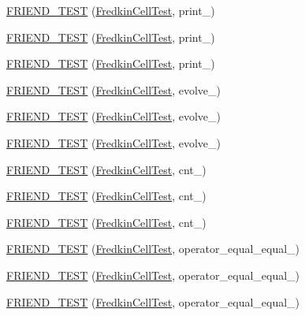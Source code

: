 \begin{DoxyCompactItemize}
\item 
\hyperlink{classFredkinCell_aac5c84ac580e6e1e332ecc0cf38680f3}{F\-R\-I\-E\-N\-D\-\_\-\-T\-E\-S\-T} (\hyperlink{classFredkinCell_aef267ce10e0a76047d409a41033eea05}{Fredkin\-Cell\-Test}, print\-\_)
\item 
\hyperlink{classFredkinCell_a134f08a3c36618fb6e8ae33f419e6aec}{F\-R\-I\-E\-N\-D\-\_\-\-T\-E\-S\-T} (\hyperlink{classFredkinCell_aef267ce10e0a76047d409a41033eea05}{Fredkin\-Cell\-Test}, print\-\_)
\item 
\hyperlink{classFredkinCell_a707a250c84473f2fd88defae0fb47ae4}{F\-R\-I\-E\-N\-D\-\_\-\-T\-E\-S\-T} (\hyperlink{classFredkinCell_aef267ce10e0a76047d409a41033eea05}{Fredkin\-Cell\-Test}, print\-\_)
\item 
\hyperlink{classFredkinCell_a6fb79cedf31164ba2f4398fe68a36f2b}{F\-R\-I\-E\-N\-D\-\_\-\-T\-E\-S\-T} (\hyperlink{classFredkinCell_aef267ce10e0a76047d409a41033eea05}{Fredkin\-Cell\-Test}, evolve\-\_)
\item 
\hyperlink{classFredkinCell_a29bba649687bbc439dece27407b2e6ff}{F\-R\-I\-E\-N\-D\-\_\-\-T\-E\-S\-T} (\hyperlink{classFredkinCell_aef267ce10e0a76047d409a41033eea05}{Fredkin\-Cell\-Test}, evolve\-\_)
\item 
\hyperlink{classFredkinCell_ae04c84ed7873cec65e12d0ff9f967e96}{F\-R\-I\-E\-N\-D\-\_\-\-T\-E\-S\-T} (\hyperlink{classFredkinCell_aef267ce10e0a76047d409a41033eea05}{Fredkin\-Cell\-Test}, evolve\-\_)
\item 
\hyperlink{classFredkinCell_acf5e50720cbd32a8d364439c18bfc252}{F\-R\-I\-E\-N\-D\-\_\-\-T\-E\-S\-T} (\hyperlink{classFredkinCell_aef267ce10e0a76047d409a41033eea05}{Fredkin\-Cell\-Test}, cnt\-\_)
\item 
\hyperlink{classFredkinCell_a2dffa5c78369958aba15632ff01b5c7d}{F\-R\-I\-E\-N\-D\-\_\-\-T\-E\-S\-T} (\hyperlink{classFredkinCell_aef267ce10e0a76047d409a41033eea05}{Fredkin\-Cell\-Test}, cnt\-\_)
\item 
\hyperlink{classFredkinCell_a4af188e02e47919f4ed8940d5aab9892}{F\-R\-I\-E\-N\-D\-\_\-\-T\-E\-S\-T} (\hyperlink{classFredkinCell_aef267ce10e0a76047d409a41033eea05}{Fredkin\-Cell\-Test}, cnt\-\_)
\item 
\hyperlink{classFredkinCell_a240c3858477db50befb34f15a5878cb4}{F\-R\-I\-E\-N\-D\-\_\-\-T\-E\-S\-T} (\hyperlink{classFredkinCell_aef267ce10e0a76047d409a41033eea05}{Fredkin\-Cell\-Test}, operator\-\_\-equal\-\_\-equal\-\_)
\item 
\hyperlink{classFredkinCell_aff070b9cdac9c939cd7a3fff8486913b}{F\-R\-I\-E\-N\-D\-\_\-\-T\-E\-S\-T} (\hyperlink{classFredkinCell_aef267ce10e0a76047d409a41033eea05}{Fredkin\-Cell\-Test}, operator\-\_\-equal\-\_\-equal\-\_)
\item 
\hyperlink{classFredkinCell_ae787a522eabac8403788332a5e885628}{F\-R\-I\-E\-N\-D\-\_\-\-T\-E\-S\-T} (\hyperlink{classFredkinCell_aef267ce10e0a76047d409a41033eea05}{Fredkin\-Cell\-Test}, operator\-\_\-equal\-\_\-equal\-\_)
\end{DoxyCompactItemize}

